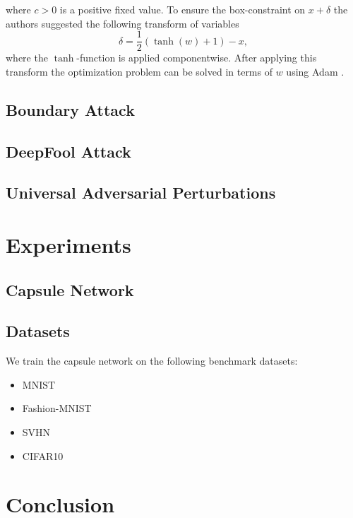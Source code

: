 \documentclass{article}
\begin{document}
where $c>0$ is a positive fixed value. To ensure the box-constraint on $x+\delta$ the authors suggested the following transform of variables 
$$\delta = \frac{1}{2}(\tanh(w)+1)-x,$$ where the $\tanh$-function is applied componentwise. After applying this transform the optimization problem can be solved in terms of $w$ using Adam \cite{adam}.

\subsection{Boundary Attack}

\cite{boundary}

\subsection{DeepFool Attack}

\cite{deepfool}

\subsection{Universal Adversarial Perturbations}
\cite{universal}

\section{Experiments}

\subsection{Capsule Network}

\subsection{Datasets}

We train the capsule network on the following benchmark datasets:
\begin{itemize}
	\item MNIST \cite{mnist}
	\item Fashion-MNIST \cite{fashion}
	\item SVHN \cite{svhn}
	\item CIFAR10 \cite{cifar}
\end{itemize}

\section{Conclusion}



\end{document}
